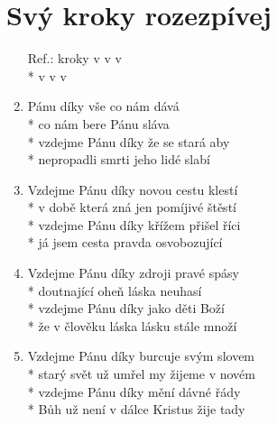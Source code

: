 \section{Svý kroky rozezpívej}
\begin{enumerate}
\item[Ref.:]  kroky v v v  \\*
 v v v 
\item {} Pánu díky vše co nám dává \\*
 co nám bere  Pánu sláva \\*
vzdejme Pánu díky že se stará aby \\*
nepropadli smrti jeho lidé slabí 
\item Vzdejme Pánu díky novou cestu klestí \\*
v době která zná jen pomíjivé štěstí \\*
vzdejme Pánu díky křížem přišel říci \\*
já jsem cesta pravda osvobozující 
\item Vzdejme Pánu díky zdroji pravé spásy \\*
doutnající oheň láska neuhasí \\*
vzdejme Pánu díky jako děti Boží \\*
že v člověku láska lásku stále množí 
\item Vzdejme Pánu díky burcuje svým slovem \\*
starý svět už umřel my žijeme v novém \\*
vzdejme Pánu díky mění dávné řády \\*
Bůh už není v dálce Kristus žije tady 
\end{enumerate}
